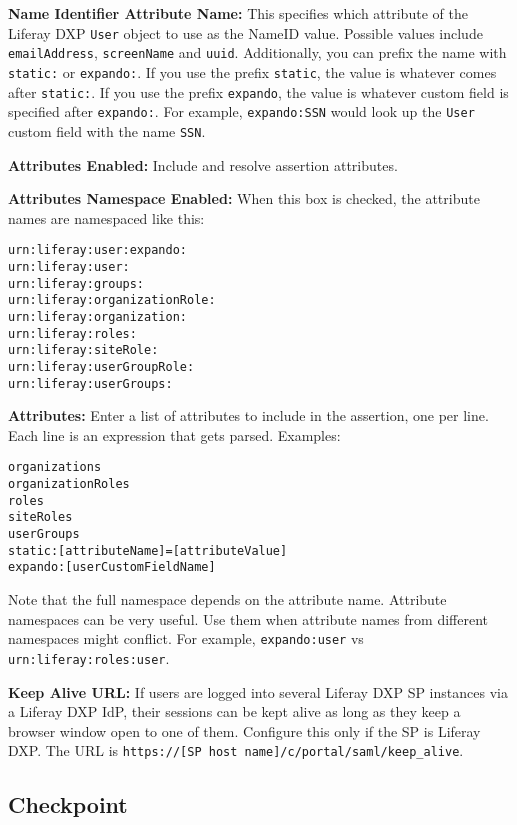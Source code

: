 \textbf{Name Identifier Attribute Name:} This specifies which attribute
of the Liferay DXP \texttt{User} object to use as the NameID value.
Possible values include \texttt{emailAddress}, \texttt{screenName} and
\texttt{uuid}. Additionally, you can prefix the name with
\texttt{static:} or \texttt{expando:}. If you use the prefix
\texttt{static}, the value is whatever comes after \texttt{static:}. If
you use the prefix \texttt{expando}, the value is whatever custom field
is specified after \texttt{expando:}. For example, \texttt{expando:SSN}
would look up the \texttt{User} custom field with the name \texttt{SSN}.

\textbf{Attributes Enabled:} Include and resolve assertion attributes.

\textbf{Attributes Namespace Enabled:} When this box is checked, the
attribute names are namespaced like this:

\begin{verbatim}
urn:liferay:user:expando:
urn:liferay:user:
urn:liferay:groups:
urn:liferay:organizationRole:
urn:liferay:organization:
urn:liferay:roles:
urn:liferay:siteRole:
urn:liferay:userGroupRole:
urn:liferay:userGroups:
\end{verbatim}

\textbf{Attributes:} Enter a list of attributes to include in the
assertion, one per line. Each line is an expression that gets parsed.
Examples:

\begin{verbatim}
organizations
organizationRoles
roles
siteRoles
userGroups
static:[attributeName]=[attributeValue]
expando:[userCustomFieldName] 
\end{verbatim}

Note that the full namespace depends on the attribute name. Attribute
namespaces can be very useful. Use them when attribute names from
different namespaces might conflict. For example, \texttt{expando:user}
vs \texttt{urn:liferay:roles:user}.

\textbf{Keep Alive URL:} If users are logged into several Liferay DXP SP
instances via a Liferay DXP IdP, their sessions can be kept alive as
long as they keep a browser window open to one of them. Configure this
only if the SP is Liferay DXP. The URL is
\texttt{https://{[}SP\ host\ name{]}/c/portal/saml/keep\_alive}.

\subsection{Checkpoint}\label{checkpoint-1}

